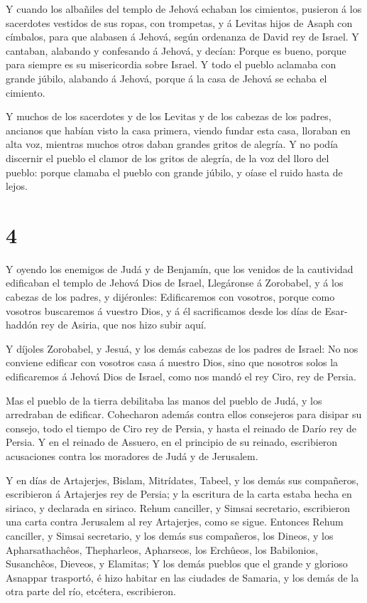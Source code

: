  Y cuando los albañiles del templo de Jehová echaban los
cimientos, pusieron á los sacerdotes vestidos de sus ropas, con
trompetas, y á Levitas hijos de Asaph con címbalos, para que alabasen á
Jehová, según ordenanza de David rey de Israel.  Y
cantaban, alabando y confesando á Jehová, y decían: Porque es bueno,
porque para siempre es su misericordia sobre Israel. Y todo el pueblo
aclamaba con grande júbilo, alabando á Jehová, porque á la casa de
Jehová se echaba el cimiento.

 Y muchos de los sacerdotes y de los Levitas y de los
cabezas de los padres, ancianos que habían visto la casa primera, viendo
fundar esta casa, lloraban en alta voz, mientras muchos otros daban
grandes gritos de alegría.  Y no podía discernir el pueblo
el clamor de los gritos de alegría, de la voz del lloro del pueblo:
porque clamaba el pueblo con grande júbilo, y oíase el ruido hasta de
lejos.

\hypertarget{section-3}{%
\section{4}\label{section-3}}

 Y oyendo los enemigos de Judá y de Benjamín, que los
venidos de la cautividad edificaban el templo de Jehová Dios de Israel,
 Llegáronse á Zorobabel, y á los cabezas de los padres, y
dijéronles: Edificaremos con vosotros, porque como vosotros buscaremos á
vuestro Dios, y á él sacrificamos desde los días de Esar-haddón rey de
Asiria, que nos hizo subir aquí.

 Y díjoles Zorobabel, y Jesuá, y los demás cabezas de los
padres de Israel: No nos conviene edificar con vosotros casa á nuestro
Dios, sino que nosotros solos la edificaremos á Jehová Dios de Israel,
como nos mandó el rey Ciro, rey de Persia.

 Mas el pueblo de la tierra debilitaba las manos del pueblo
de Judá, y los arredraban de edificar.  Cohecharon además
contra ellos consejeros para disipar su consejo, todo el tiempo de Ciro
rey de Persia, y hasta el reinado de Darío rey de Persia.  Y
en el reinado de Assuero, en el principio de su reinado, escribieron
acusaciones contra los moradores de Judá y de Jerusalem.

 Y en días de Artajerjes, Bislam, Mitrídates, Tabeel, y los
demás sus compañeros, escribieron á Artajerjes rey de Persia; y la
escritura de la carta estaba hecha en siriaco, y declarada en siriaco.
 Rehum canciller, y Simsai secretario, escribieron una carta
contra Jerusalem al rey Artajerjes, como se sigue.  Entonces
Rehum canciller, y Simsai secretario, y los demás sus compañeros, los
Dineos, y los Apharsathachêos, Thepharleos, Apharseos, los Erchûeos, los
Babilonios, Susanchêos, Dieveos, y Elamitas;  Y los demás
pueblos que el grande y glorioso Asnappar trasportó, é hizo habitar en
las ciudades de Samaria, y los demás de la otra parte del río, etcétera,
escribieron.

